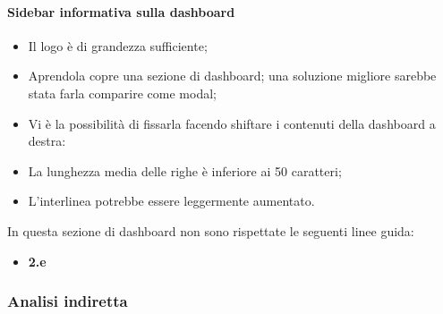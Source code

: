 \paragraph{Sidebar informativa sulla dashboard}
\begin{itemize}
    \item Il logo è di grandezza sufficiente;
    \item Aprendola copre una sezione di dashboard; una soluzione migliore sarebbe stata farla comparire come modal;
    \item Vi è la possibilità di fissarla facendo shiftare i contenuti della dashboard a destra:
    \item La lunghezza media delle righe è inferiore ai 50 caratteri;
    \item L'interlinea potrebbe essere leggermente aumentato.
\end{itemize}
In questa sezione di dashboard non sono rispettate le seguenti linee guida:
\begin{itemize}
    \item \textbf{2.e}
\end{itemize}

\subsubsection{Analisi indiretta}
